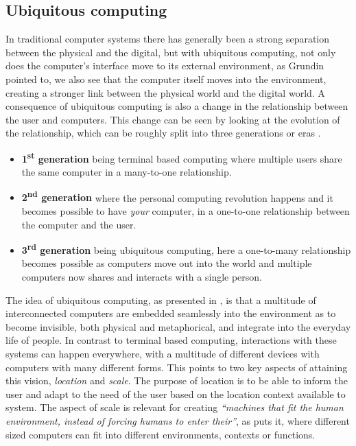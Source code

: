 \subsection{Ubiquitous computing}
In traditional computer systems there has generally been a strong separation between the physical and the digital, but with ubiquitous computing, not only does the computer's interface move to its external environment, as Grundin pointed to, we also see that the computer itself moves into the environment, creating a stronger link between the physical world and the digital world.
A consequence of ubiquitous computing is also a change in the relationship between the user and computers.
This change can be seen by looking at the evolution of the relationship, which can be roughly split into three generations or eras \citep{weiser1997coming,abowd2012next}.
\begin{itemize}
\item[] \textbf{1\textsuperscript{st} generation} being terminal based computing where multiple users share the same computer in a many-to-one relationship.
\item[] \textbf{2\textsuperscript{nd} generation} where the personal computing revolution happens and it becomes possible to have \emph{your} computer, in a one-to-one relationship between the computer and the user.
\item[] \textbf{3\textsuperscript{rd} generation} being ubiquitous computing, here a one-to-many relationship becomes possible as computers move out into the world and multiple computers now shares and interacts with a single person.
\end{itemize}

The idea of ubiquitous computing, as presented in \citep{weiser1991computer}, is that a multitude of interconnected computers are embedded seamlessly into the environment as to become invisible, both physical and metaphorical, and integrate into the everyday life of people.
In contrast to terminal based computing, interactions with these systems can happen everywhere, with a multitude of different devices with computers with many different forms. 
This points to two key aspects of attaining this vision, \emph{location} and \emph{scale}.
The purpose of location is to be able to inform the user and adapt to the need of the user based on the location context available to system. 
The aspect of scale is relevant for creating \emph{``machines that fit the human environment, instead of
forcing humans to enter their''}, as \citeauthor{weiser1991computer} puts it, where different sized computers can fit into different environments, contexts or functions. 

